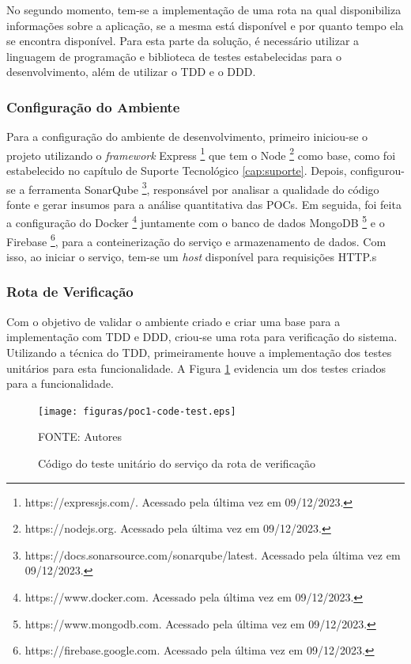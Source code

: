 No segundo momento, tem-se a implementação de uma rota na qual disponibiliza informações 
sobre a aplicação, se a mesma está disponível e por quanto tempo ela se 
encontra disponível. Para esta parte da solução, é necessário utilizar a linguagem de 
programação e biblioteca de testes estabelecidas para o desenvolvimento, além de utilizar o TDD e o DDD.

\subsubsection{Configuração do Ambiente}

Para a configuração do ambiente de desenvolvimento, primeiro iniciou-se o projeto utilizando o 
\textit{framework} Express \footnote{https://expressjs.com/. Acessado pela última vez em 09/12/2023.} que tem o 
Node \footnote{https://nodejs.org. Acessado pela última vez em 09/12/2023.} como base, como foi estabelecido no capítulo de Suporte 
Tecnológico \ref{cap:suporte}. Depois, configurou-se a ferramenta SonarQube \footnote{https://docs.sonarsource.com/sonarqube/latest. Acessado pela última vez em 09/12/2023.}, 
responsável por analisar a qualidade do código fonte e gerar insumos para a análise quantitativa 
das POCs. Em seguida, foi feita a configuração do Docker \footnote{https://www.docker.com. Acessado pela última vez em 09/12/2023.} juntamente com o banco 
de dados MongoDB \footnote{https://www.mongodb.com. Acessado pela última vez em 09/12/2023.} e o Firebase \footnote{https://firebase.google.com. Acessado pela última vez em 09/12/2023.}, para a conteinerização do serviço 
e armazenamento de dados. Com isso, ao iniciar o serviço, tem-se um \textit{host} disponível para 
requisições HTTP.s

\subsubsection{Rota de Verificação}

Com o objetivo de validar o ambiente criado e criar uma base para a implementação com TDD e DDD, criou-se uma 
rota para verificação do sistema. Utilizando a técnica do TDD, primeiramente houve a implementação dos testes 
unitários para esta funcionalidade. A Figura \ref{fig-poc1-code-test} evidencia um dos testes criados para a funcionalidade.

\begin{figure}[h]
	\centering
  \caption{Código do teste unitário do serviço da rota de verificação}
	\texttt{[image: figuras/poc1-code-test.eps]}
	\parbox{\linewidth}{\centering FONTE: Autores}
	\label{fig-poc1-code-test}
\end{figure}

